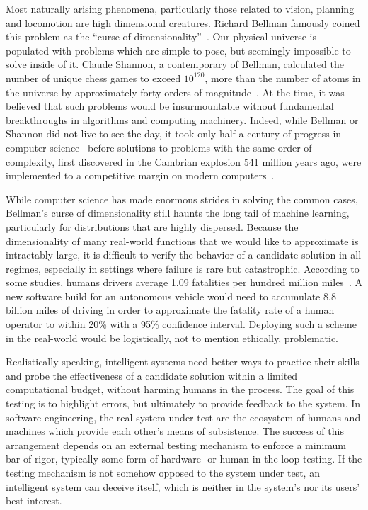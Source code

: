 Most naturally arising phenomena, particularly those related to vision, planning and locomotion are high dimensional creatures. Richard Bellman famously coined this problem as the ``curse of dimensionality''~\citep{bellman1957dynamic}. Our physical universe is populated with problems which are simple to pose, but seemingly impossible to solve inside of it. Claude Shannon, a contemporary of Bellman, calculated the number of unique chess games to exceed $10^{120}$, more than the number of atoms in the universe by approximately forty orders of magnitude~\citep{shannon1950chess}. At the time, it was believed that such problems would be insurmountable without fundamental breakthroughs in algorithms and computing machinery. Indeed, while Bellman or Shannon did not live to see the day, it took only half a century of progress in computer science~\citep{campbell2002deep} before solutions to problems with the same order of complexity, first discovered in the Cambrian explosion 541 million years ago, were implemented to a competitive margin on modern computers~\citep{pratt2015cambrian}.

While computer science has made enormous strides in solving the common cases, Bellman's curse of dimensionality still haunts the long tail of machine learning, particularly for distributions that are highly dispersed. Because the dimensionality of many real-world functions that we would like to approximate is intractably large, it is difficult to verify the behavior of a candidate solution in all regimes, especially in settings where failure is rare but catastrophic. According to some studies, humans drivers average 1.09 fatalities per hundred million miles~\citep{kalra2016driving}. A new software build for an autonomous vehicle would need to accumulate 8.8 billion miles of driving in order to approximate the fatality rate of a human operator to within 20\% with a 95\% confidence interval. Deploying such a scheme in the real-world would be logistically, not to mention ethically, problematic.

Realistically speaking, intelligent systems need better ways to practice their skills and probe the effectiveness of a candidate solution within a limited computational budget, without harming humans in the process. The goal of this testing is to highlight errors, but ultimately to provide feedback to the system. In software engineering, the real system under test are the ecosystem of humans and machines which provide each other's means of subsistence. The success of this arrangement depends on an external testing mechanism to enforce a minimum bar of rigor, typically some form of hardware- or human-in-the-loop testing. If the testing mechanism is not somehow opposed to the system under test, an intelligent system can deceive itself, which is neither in the system's nor its users' best interest.

